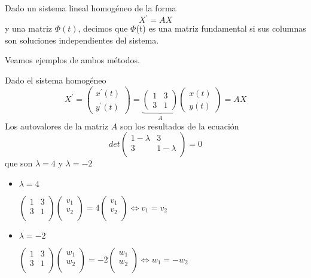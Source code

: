 \begin{definition}
Dado un sistema lineal homogéneo de la forma $$X^\prime = AX$$
y una matriz $\Phi(t)$, decimos que $\Phi$(t) es una matriz fundamental si sus columnas son soluciones independientes del sistema.
\end{definition}

Veamos ejemplos de ambos métodos.

\begin{example} [(Método 1)]
Dado el sistema homogéneo$$X^\prime = \begin{pmatrix}
x^\prime(t)\\y^\prime(t)
\end{pmatrix}
= \underbrace{\begin{pmatrix}
1 & 3\\3 & 1
\end{pmatrix}}_{A}\begin{pmatrix}
x(t)\\y(t)
\end{pmatrix} = AX$$
Los autovalores de la matriz $A$ son los resultados de la ecuación $$det\begin{pmatrix}
1-\lambda & 3\\3 &1-\lambda\\
\end{pmatrix}=0$$
que son $\lambda = 4$ y $\lambda = -2$
\begin{itemize}
\item $\lambda = 4$

$\begin{pmatrix}
1 & 3\\ 3 & 1\\
\end{pmatrix}\begin{pmatrix}
v_1\\v_2\\
\end{pmatrix} = 4\begin{pmatrix}
v_1\\v_2\\
\end{pmatrix} \iff v_1 = v_2$

\item $\lambda = -2$

$\begin{pmatrix}
1 & 3\\ 3 & 1\\
\end{pmatrix}\begin{pmatrix}
w_1\\w_2\\
\end{pmatrix} = -2\begin{pmatrix}
w_1\\w_2\\
\end{pmatrix} \iff w_1 = -w_2$
\end{itemize}


\end{example}
